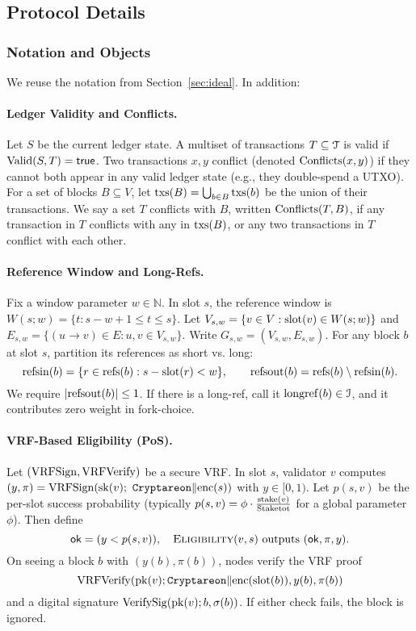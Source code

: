 \subsection{Protocol Details}

\subsubsection{Notation and Objects}
\label{subsec:notation}
We reuse the notation from Section~\ref{sec:ideal}. In addition:
\paragraph{Ledger Validity and Conflicts.}
Let $S$ be the current ledger state. A multiset of transactions $T\subseteq \mathcal{T}$ is valid if $\mathrm{Valid}(S,T)=\textsf{true}$. Two transactions $x,y$ conflict (denoted $\mathrm{Conflicts}(x,y)$) if they cannot both appear in any valid ledger state (e.g., they double-spend a UTXO). For a set of blocks $B\subseteq V$, let $\mathrm{txs}(B)=\bigcup_{b\in B}\mathrm{txs}(b)$ be the union of their transactions. We say a set $T$ conflicts with $B$, written $\mathrm{Conflicts}(T,B)$, if any transaction in $T$ conflicts with any in $\mathrm{txs}(B)$, or any two transactions in $T$ conflict with each other.

\paragraph{Reference Window and Long-Refs.}
Fix a window parameter $w\in\mathbb{N}$. In slot $s$, the reference window is $W(s;w)=\{t: s-w+1\le t \le s\}$. Let $V_{s,w}=\{v\in V: \mathrm{slot}(v)\in W(s;w)\}$ and $E_{s,w}=\{(u\to v)\in E: u,v\in V_{s,w}\}$. Write $G_{s,w}=(V_{s,w},E_{s,w})$. For any block $b$ at slot $s$, partition its references as short vs. long:
\begin{equation*}
\mathrm{refs}{\mathrm{in}}(b)=\{r\in\mathrm{refs}(b): s-\mathrm{slot}(r)<w\}, \qquad
\mathrm{refs}{\mathrm{out}}(b)=\mathrm{refs}(b)\setminus\mathrm{refs}{\mathrm{in}}(b).
\end{equation*}
We require $|\mathrm{refs}{\mathrm{out}}(b)|\le1$. If there is a long-ref, call it $\mathrm{longref}(b)\in\mathcal{I}$, and it contributes zero weight in fork-choice.

\paragraph{VRF-Based Eligibility (PoS).}
Let $(\mathrm{VRFSign},\mathrm{VRFVerify})$ be a secure VRF. In slot $s$, validator $v$ computes $(y,\pi)=\VRFSign(\sk(v);\ \domsep\|\Encode(s))$ with $y\in[0,1)$. Let $p(s,v)$ be the per-slot success probability (typically $p(s,v)=\phi\cdot\frac{\mathrm{stake}(v)}{\mathrm{Stake}{\mathrm{tot}}}$ for a global parameter $\phi$). Then define
\begin{equation*}
\mathsf{ok} = (y < p(s,v)),\quad \textsc{Eligibility}(v,s)\text{ outputs }(\mathsf{ok},\pi,y).
\end{equation*}
On seeing a block $b$ with $(y(b),\pi(b))$, nodes verify the VRF proof $$\mathrm{VRFVerify}(\mathrm{pk}(v);\allowbreak \mathtt{Cryptareon}\|\mathrm{enc}(\mathrm{slot}(b)), y(b), \pi(b))$$ and a digital signature $\mathrm{VerifySig}(\mathrm{pk}(v); b, \sigma(b))$. If either check fails, the block is ignored.


